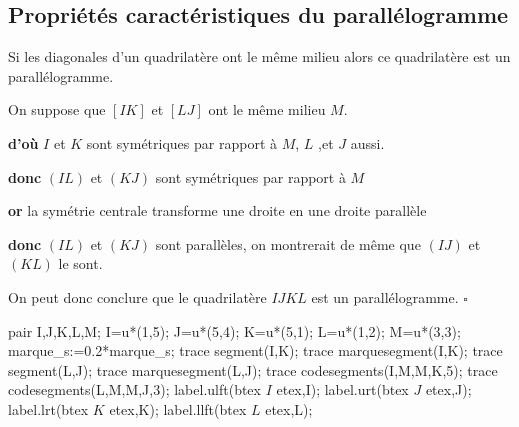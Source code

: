 \begin{changemargin}{0mm}{-15mm}
    \section{Propriétés caractéristiques du parallélogramme}
    \begin{propriete}
        Si les diagonales d'un quadrilatère ont le même milieu alors ce quadrilatère est un parallélogramme.
    \end{propriete}
    \begin{preuve}
        \phantom{rrr}

        \begin{minipage}{0.65\linewidth}
            On suppose que $[IK]$ et $[LJ]$ ont le même milieu $M$.
            \par \textbf{d'où} $I$ et $K$ sont symétriques par rapport à $M$, $L$ ,et $J$ aussi. 
            \par \textbf{donc} $(IL)$ et $(KJ)$ sont symétriques par rapport à $M$
            \par \textbf{or} la symétrie centrale transforme une droite en une droite parallèle
            \par \textbf{donc} $(IL)$ et $(KJ)$ sont parallèles, on montrerait de même que $(IJ)$ et $(KL)$ le sont.
            \par On peut donc conclure que le quadrilatère $IJKL$ est un parallélogramme. $\square$
        \end{minipage}
        \begin{minipage}{7cm}
            \begin{center}
                \begin{Geometrie}[CoinHD={(7u,6u)}]
                    pair I,J,K,L,M;
                    I=u*(1,5);
                    J=u*(5,4);
                    K=u*(5,1);
                    L=u*(1,2);
                    M=u*(3,3);
                    marque_s:=0.2*marque_s;
                    trace segment(I,K);
                    trace marquesegment(I,K);
                    trace segment(L,J);                    
                    trace marquesegment(L,J);
                    trace codesegments(I,M,M,K,5);
                    trace codesegments(L,M,M,J,3);
                    label.ulft(btex $I$ etex,I);
                    label.urt(btex $J$ etex,J);
                    label.lrt(btex $K$ etex,K);
                    label.llft(btex $L$ etex,L);

\end{Geometrie}
\end{center}
\end{minipage}
\end{preuve}
\end{changemargin}
